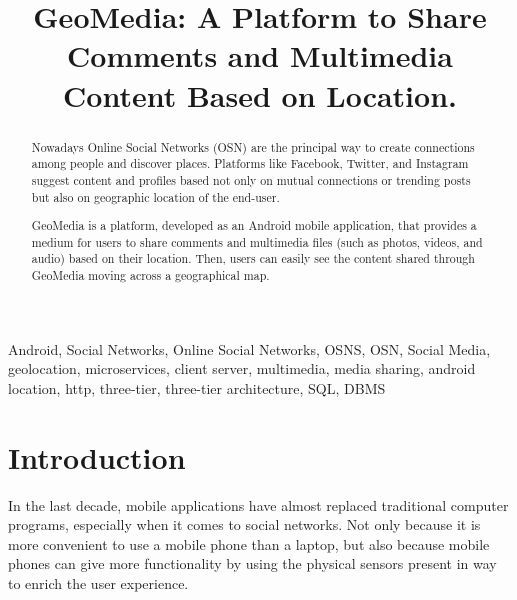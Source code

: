 \documentclass[conference]{IEEEtran}
\begin{document}
\title{GeoMedia: A Platform to Share Comments and Multimedia Content Based on Location.\\
}

\author{
\and
{}
}

\maketitle

\begin{abstract}
Nowadays Online Social Networks (OSN) are the principal way to create connections among people and discover places.
Platforms like Facebook, Twitter, and Instagram suggest content and profiles based not only on mutual connections or trending posts but also on geographic location of the end-user.

GeoMedia is a platform, developed as an Android mobile application, that provides a medium for users to share comments and multimedia files (such as photos, videos, and audio) based on their location.
Then, users can easily see the content shared through GeoMedia moving across a geographical map.
\end{abstract}

\begin{IEEEkeywords}
Android, Social Networks, Online Social Networks, OSNS, OSN, Social Media, geolocation, microservices, client server, multimedia, media sharing, android location, http, three-tier, three-tier architecture, SQL, DBMS
\end{IEEEkeywords}

\section{Introduction}
In the last decade, mobile applications have almost replaced traditional computer programs, especially when it comes to social networks. Not only because it is more convenient to use a mobile phone than a laptop, but also because mobile phones can give more functionality by using the physical sensors present in way to enrich the user experience.
\end{document}

